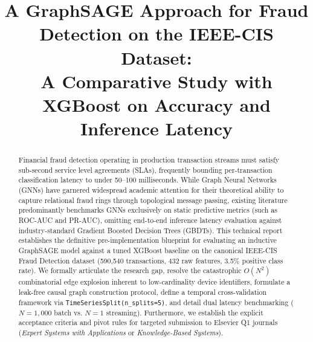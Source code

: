 \documentclass[11pt,a4paper]{article}
\begin{document}
\title{\Large \textbf{A GraphSAGE Approach for Fraud Detection on the IEEE-CIS Dataset:\\A Comparative Study with XGBoost on Accuracy and Inference Latency}}
\author{}
\date{}

\maketitle

\begin{abstract}
Financial fraud detection operating in production transaction streams must satisfy sub-second service level agreements (SLAs), frequently bounding per-transaction classification latency to under 50--100 milliseconds. While Graph Neural Networks (GNNs) have garnered widespread academic attention for their theoretical ability to capture relational fraud rings through topological message passing, existing literature predominantly benchmarks GNNs exclusively on static predictive metrics (such as ROC-AUC and PR-AUC), omitting end-to-end inference latency evaluation against industry-standard Gradient Boosted Decision Trees (GBDTs). This technical report establishes the definitive pre-implementation blueprint for evaluating an inductive GraphSAGE model against a tuned XGBoost baseline on the canonical IEEE-CIS Fraud Detection dataset (590,540 transactions, 432 raw features, 3.5\% positive class rate). We formally articulate the research gap, resolve the catastrophic $O(N^2)$ combinatorial edge explosion inherent to low-cardinality device identifiers, formulate a leak-free causal graph construction protocol, define a temporal cross-validation framework via \texttt{TimeSeriesSplit(n\_splits=5)}, and detail dual latency benchmarking ($N=1,000$ batch vs. $N=1$ streaming). Furthermore, we establish the explicit acceptance criteria and pivot rules for targeted submission to Elsevier Q1 journals (\textit{Expert Systems with Applications} or \textit{Knowledge-Based Systems}).
\end{abstract}

\vspace{1.5em}
\newpage
\tableofcontents
\vspace{1.5em}
\listoftables
\newpage
\end{document}
